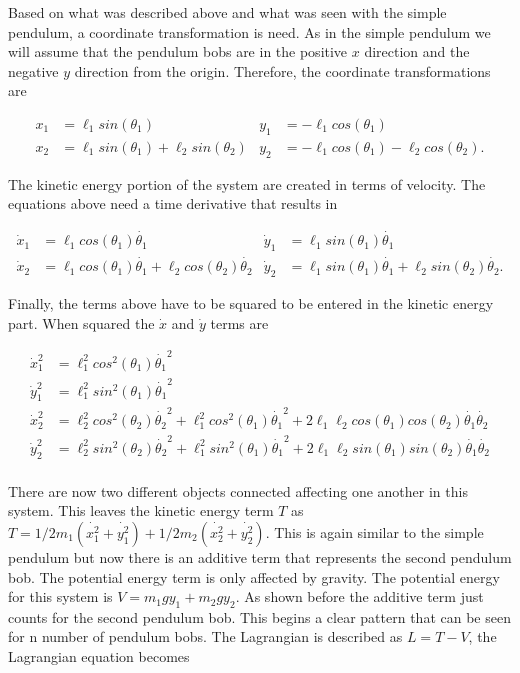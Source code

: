 \documentclass[runningheads]{llncs}
\begin{document}
Based on what was described above and what was seen with the simple pendulum, a coordinate transformation is need. As in the simple pendulum we will assume that the pendulum bobs are in the positive $x$ direction and the negative $y$ direction from the origin. Therefore, the coordinate transformations are

\begin{align*}
 x_{1} &= \ell_{1} sin(\theta_{1}) & y_{1} &= -\ell_{1} cos(\theta_{1}) \\
 x_{2} &= \ell_{1} sin(\theta_{1}) + \ell_{2} sin(\theta_{2}) & y_{2} &= -\ell_{1} cos(\theta_{1}) -\ell_{2} cos(\theta_{2}).
\end{align*}

The kinetic energy portion of the system are created in terms of velocity. The equations above need a time derivative that results in

\begin{align*}
 \dot{x}_{1} &= \ell_{1} cos(\theta_{1})\dot{\theta_{1}} & \dot{y}_{1} &= \ell_{1} sin(\theta_{1})\dot{\theta_{1}} \\
 \dot{x}_{2} &= \ell_{1} cos(\theta_{1})\dot{\theta_{1}} + \ell_{2} cos(\theta_{2})\dot{\theta_{2}} & \dot{y}_{2} &= \ell_{1} sin(\theta_{1})\dot{\theta_{1}} + \ell_{2} sin(\theta_{2})\dot{\theta_{2}}.
\end{align*}

Finally, the terms above have to be squared to be entered in the kinetic energy part. When squared the $\dot{x}$ and $\dot{y}$ terms are

\begin{align*}
 \dot{x}_{1}^{2} &= \ell_{1}^{2} cos^{2}(\theta_{1})\dot{\theta_{1}}^{2} \\
 \dot{y}_{1}^{2} &= \ell_{1}^{2} sin^{2}(\theta_{1})\dot{\theta_{1}} ^{2}\\ 
 \dot{x}_{2}^{2} &= \ell_{2}^{2}cos^{2}(\theta_{2})\dot{\theta_{2}}^{2} + \ell_{1}^{2}cos^{2}(\theta_{1})\dot{\theta_{1}}^{2} + 2\ell_{1}\ell_{2}cos(\theta_{1})cos(\theta_{2})\dot{\theta_{1}}\dot{\theta_{2}} \\
 \dot{y}_{2}^{2} &= \ell_{2}^{2}sin^{2}(\theta_{2})\dot{\theta_{2}}^{2} + \ell_{1}^{2}sin^{2}(\theta_{1})\dot{\theta_{1}}^{2} + 2\ell_{1}\ell_{2}sin(\theta_{1})sin(\theta_{2})\dot{\theta_{1}}\dot{\theta_{2}} \\ 
\end{align*}

There are now two different objects connected affecting one another in this system. This leaves the kinetic energy term $T$ as $T = 1/2m_{1}(\dot{x_{1}^{2}} + \dot{y_{1}^{2}}) + 1/2m_{2}(\dot{x_{2}^{2}} + \dot{y_{2}^{2}})$. This is again similar to the simple pendulum but now there is an additive term that represents the second pendulum bob. The potential energy term is only affected by gravity. The potential energy for this system is $V = m_{1}gy_{1} + m_{2}gy_{2}$. As shown before the additive term just counts for the second pendulum bob. This begins a clear pattern that can be seen for n number of pendulum bobs. The Lagrangian is described as $L = T - V$, the Lagrangian equation becomes 
\end{document}
